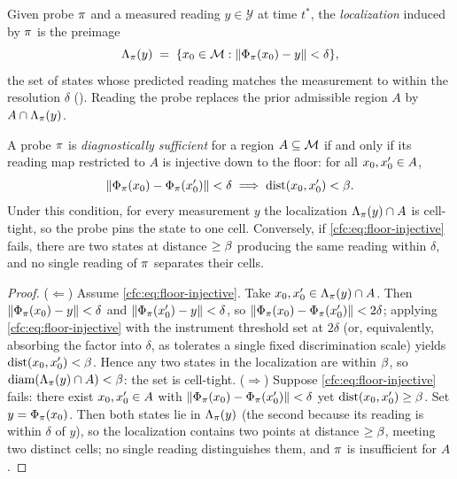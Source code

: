 \begin{definition}
\label{cfc:def:loc}
Given probe $\pi$ and a measured reading $y\in\mathcal{Y}$ at time
$t^{\ast}$, the \emph{localization} induced by $\pi$ is the preimage
\begin{equation}
\Lambda_\pi(y)\;=\;\{x_0\in\mathcal{M}:\norm{\Phi_\pi(x_0)-y}<\delta\},
\label{cfc:eq:loc}
\end{equation}
the set of states whose predicted reading matches the measurement to within the
resolution $\delta$ (). Reading the probe replaces the prior
admissible region $A$ by $A\cap\Lambda_\pi(y)$.
\end{definition}

\begin{theorem}
\label{cfc:thm:localization}
A probe $\pi$ is \emph{diagnostically sufficient} for a region
$A\subseteq\mathcal{M}$ if and only if its reading map restricted to $A$ is injective
down to the floor: for all $x_0,x_0'\in A$,
\begin{equation}
\norm{\Phi_\pi(x_0)-\Phi_\pi(x_0')}<\delta
\;\Longrightarrow\;\operatorname{dist}(x_0,x_0')<\beta.
\label{cfc:eq:floor-injective}
\end{equation}
Under this condition, for every measurement $y$ the localization
$\Lambda_\pi(y)\cap A$ is cell-tight, so the probe pins the state to one cell.
Conversely, if \eqref{cfc:eq:floor-injective} fails, there are two states at
distance $\ge\beta$ producing the same reading within $\delta$, and no single
reading of $\pi$ separates their cells.
\end{theorem}

\begin{proof}
($\Leftarrow$) Assume \eqref{cfc:eq:floor-injective}. Take
$x_0,x_0'\in\Lambda_\pi(y)\cap A$. Then
$\norm{\Phi_\pi(x_0)-y}<\delta$ and $\norm{\Phi_\pi(x_0')-y}<\delta$,
so $\norm{\Phi_\pi(x_0)-\Phi_\pi(x_0')}<2\delta$; applying
\eqref{cfc:eq:floor-injective} with the instrument threshold set at $2\delta$ (or,
equivalently, absorbing the factor into $\delta$, as 
tolerates a single fixed discrimination scale) yields
$\operatorname{dist}(x_0,x_0')<\beta$. Hence any two states in the localization are within
$\beta$, so $\operatorname{diam}(\Lambda_\pi(y)\cap A)<\beta$: the set is cell-tight.
($\Rightarrow$) Suppose \eqref{cfc:eq:floor-injective} fails: there exist
$x_0,x_0'\in A$ with
$\norm{\Phi_\pi(x_0)-\Phi_\pi(x_0')}<\delta$ yet
$\operatorname{dist}(x_0,x_0')\ge\beta$. Set $y=\Phi_\pi(x_0)$. Then both states lie
in $\Lambda_\pi(y)$ (the second because its reading is within $\delta$ of $y$),
so the localization contains two points at distance $\ge\beta$, meeting two
distinct cells; no single reading distinguishes them, and $\pi$ is
insufficient for $A$.
\end{proof}

